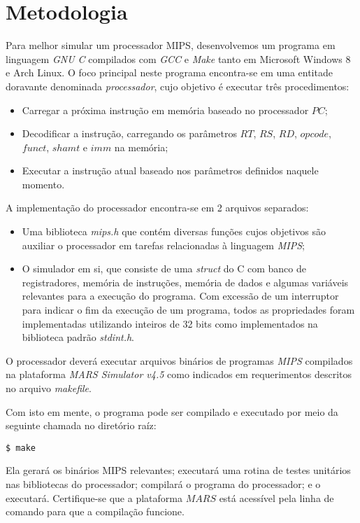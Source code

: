\documentclass[12pt, a4paper, twoside]{article}
\begin{document}
\section{Metodologia}

Para melhor simular um processador MIPS, desenvolvemos um programa em linguagem
\textit{GNU C} compilados com \textit{GCC} e \textit{Make} tanto em Microsoft
Windows 8 e Arch Linux. O foco principal neste programa encontra-se em uma
entitade doravante denominada \textit{processador}, cujo objetivo é executar
três procedimentos:

\begin{itemize}
    \item Carregar a próxima instrução em memória baseado no processador $PC$;
    \item Decodificar a instrução, carregando os parâmetros $RT$, $RS$, $RD$,
    $opcode$, $funct$, $shamt$ e $imm$ na memória;
    \item Executar a instrução atual baseado nos parâmetros definidos naquele
    momento.
\end{itemize}

A implementação do processador encontra-se em 2 arquivos separados:

\begin{itemize}
    \item Uma biblioteca \textit{mips.h} que contém diversas funções cujos
    objetivos são auxiliar o processador em tarefas relacionadas à linguagem
    \textit{MIPS};
    \item O simulador em si, que consiste de uma \textit{struct} do C com
    banco de registradores, memória de instruções, memória de dados e algumas
    variáveis relevantes para a execução do programa. Com excessão de um
    interruptor para indicar o fim da execução de um programa, todos as
    propriedades foram implementadas utilizando inteiros de 32 bits como
    implementados na biblioteca padrão \textit{stdint.h}.
\end{itemize}

O processador deverá executar arquivos binários de programas \textit{MIPS}
compilados na plataforma \textit{MARS Simulator v4.5} como indicados em
requerimentos descritos no arquivo \textit{makefile}.

Com isto em mente, o programa pode ser compilado e executado por meio da
seguinte chamada no diretório raíz:
\begin{lstlisting}[caption=Compilação do simulador MIPS]
$ make
\end{lstlisting}
Ela gerará os binários MIPS relevantes; executará uma rotina de testes
unitários nas bibliotecas do processador; compilará o programa do processador;
e o executará.
Certifique-se que a plataforma $MARS$ está acessível pela linha de comando
para que a compilação funcione.
\end{document}

